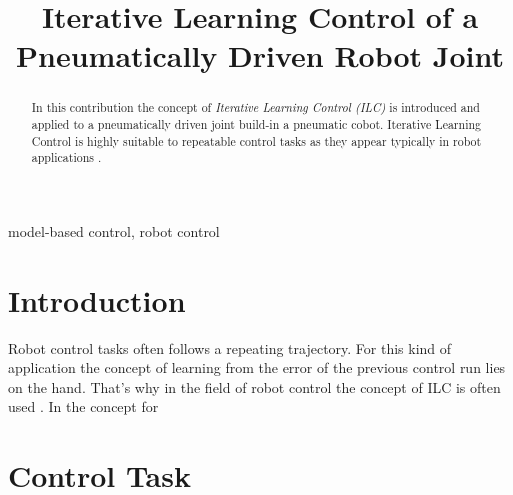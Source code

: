 \documentclass[conference]{IEEEtran}
\begin{document}
\title{Iterative Learning Control of a Pneumatically Driven Robot Joint\\
}

\author{
\and
{}
}

\maketitle

\begin{abstract}
  In this contribution the concept of {\em Iterative Learning Control
    (ILC)} is introduced and applied to a pneumatically driven joint
  build-in a pneumatic cobot. Iterative Learning Control is highly
  suitable to repeatable control tasks as they appear typically in
  robot applications \cite{Longman2000}.
\end{abstract}

\begin{IEEEkeywords}
model-based control, robot control
\end{IEEEkeywords}

\section{Introduction}
Robot control tasks often follows a repeating trajectory. For this kind
of application the concept of learning from the error of the previous
control run lies on the hand. That's why in the field of robot control
the concept of ILC is often used \cite{AhnChenEtAl2007}. In
\cite{ILCGlueck2015} the concept for

\section{Control Task}
\end{document}
